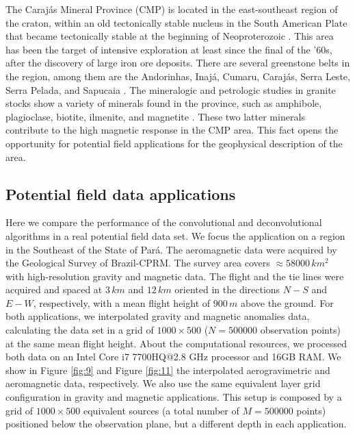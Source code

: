 The Carajás Mineral Province (CMP) is located in the east-southeast region of the craton, within an old tectonically stable nucleus in the South American Plate that became tectonically stable at the beginning of Neoproterozoic \citep{salomao-etal2019}. This area has been the target of intensive exploration at least since the final of the '60s, after the discovery of large iron ore deposits. There are several greenstone belts in the region, among them are the Andorinhas, Inajá, Cumaru, Carajás, Serra Leste, Serra Pelada, and Sapucaia \citep{santos-etal2000}. The mineralogic and petrologic studies in granite stocks show a variety of minerals found in the province, such as amphibole, plagioclase, biotite, ilmenite, and magnetite \citep{cunha-etal2016}. These two latter minerals contribute to the high magnetic response in the CMP area. This fact opens the opportunity for potential field applications for the geophysical description of the area. 

\subsection{Potential field data applications}

Here we compare the performance of the convolutional and deconvolutional algorithms in a real potential field data set. We focus the application on a region in the Southeast of the State of Pará. The aeromagnetic data were acquired by the Geological Survey of Brazil-CPRM. The survey area covers $\approx 58000 \, km^2$ with high-resolution gravity and magnetic data. The flight and the tie lines were acquired and spaced at $3 \, km$  and $12 \, km$ oriented in the directions $N-S$ and $E-W$, respectively, with a mean flight height of $900\, m$ above the ground. For both applications, we interpolated gravity and magnetic anomalies data, calculating the data set in a grid of $1000 \times 500$ ($N = 500000$ observation points) at the same mean flight height. About the computational resources, we processed both data on an Intel Core i7 7700HQ@2.8 GHz processor and 16GB RAM. We show in Figure \ref{fig:9} and Figure \ref{fig:11} the interpolated aerogravimetric and aeromagnetic data, respectively. We also use the same equivalent layer grid configuration in gravity and magnetic applications. This setup is composed by a grid of $1000 \times 500$ equivalent sources (a total number of $M = 500000$ points) positioned below the observation plane, but a different depth in each application.

